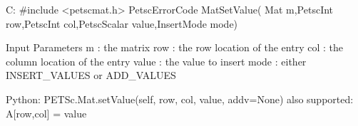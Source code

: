 C:
#include <petscmat.h>
PetscErrorCode MatSetValue(
    Mat m,PetscInt row,PetscInt col,PetscScalar value,InsertMode mode)

Input Parameters
m : the matrix
row : the row location of the entry
col : the column location of the entry
value : the value to insert
mode : either INSERT_VALUES or ADD_VALUES

Python:
PETSc.Mat.setValue(self, row, col, value, addv=None)
also supported:
A[row,col] = value
